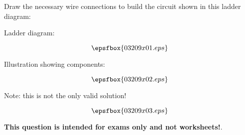 

Draw the necessary wire connections to build the circuit shown in this ladder diagram:

\vskip 10pt

Ladder diagram:

$$\epsfbox{03209x01.eps}$$

\vskip 10pt

Illustration showing components:

$$\epsfbox{03209x02.eps}$$







Note: this is not the only valid solution!

$$\epsfbox{03209x03.eps}$$







{\bf This question is intended for exams only and not worksheets!}.




